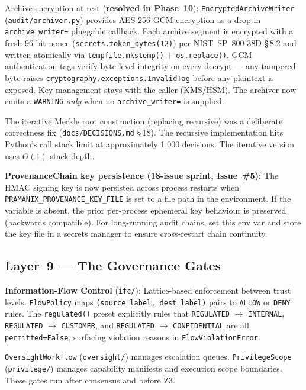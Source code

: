 \documentclass[12pt,a4paper,oneside]{report}
\newcommand{\fname}[1]{\texttt{#1}}          %
\newcommand{\code}[1]{\texttt{#1}}           %
\newcommand{\cfrsec}[1]{\S\,#1}             %
\begin{document}
Archive encryption at rest (\textbf{resolved in Phase~10}):
\code{EncryptedArchiveWriter} (\fname{audit/archiver.py}) provides
AES-256-GCM encryption as a drop-in \code{archive\_writer=} pluggable
callback.  Each archive segment is encrypted with a fresh 96-bit nonce
(\code{secrets.token\_bytes(12)}) per NIST~SP~800-38D \cfrsec{8.2} and
written atomically via \code{tempfile.mkstemp()} + \code{os.replace()}.
GCM authentication tags verify byte-level integrity on every decrypt ---
any tampered byte raises \code{cryptography.exceptions.InvalidTag} before
any plaintext is exposed.  Key management stays with the caller (KMS/HSM).
The archiver now emits a \code{WARNING} \emph{only} when no
\code{archive\_writer=} is supplied.

The iterative Merkle root construction (replacing recursive) was a deliberate
correctness fix (\fname{docs/DECISIONS.md} \cfrsec{18}). The recursive
implementation hits Python's call stack limit at approximately 1,000 decisions.
The iterative version uses $O(1)$ stack depth.

\textbf{ProvenanceChain key persistence (18-issue sprint, Issue~\#5):} The HMAC
signing key is now persisted across process restarts when
\code{PRAMANIX\_PROVENANCE\_KEY\_FILE} is set to a file path in the environment.
If the variable is absent, the prior per-process ephemeral key behaviour is
preserved (backwards compatible).  For long-running audit chains, set this env
var and store the key file in a secrets manager to ensure cross-restart
chain continuity.

\subsection{Layer~9 --- The Governance Gates}

\textbf{Information-Flow Control} (\fname{ifc/}): Lattice-based enforcement
between trust levels. \code{FlowPolicy} maps
\code{(source\_label, dest\_label)} pairs to \code{ALLOW} or \code{DENY}
rules. The \code{regulated()} preset explicitly rules that \code{REGULATED}
$\to$ \code{INTERNAL}, \code{REGULATED} $\to$ \code{CUSTOMER}, and
\code{REGULATED} $\to$ \code{CONFIDENTIAL} are all \code{permitted=False},
surfacing violation reasons in \code{FlowViolationError}.

\code{OversightWorkflow} (\fname{oversight/}) manages escalation queues.
\code{PrivilegeScope} (\fname{privilege/}) manages capability manifests and
execution scope boundaries. These gates run after consensus and before Z3.
\end{document}
